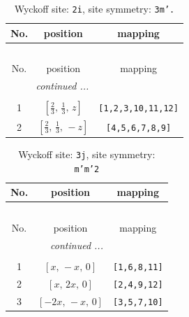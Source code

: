 \documentclass[fleqn,8pt]{jsarticle}
\begin{document}
\renewcommand{\arraystretch}{1.2}
\begin{longtable}{ccc}
\caption{Wyckoff site: {\tt 2i}, site symmetry: {\tt 3m'.}}
 \\
 \hline \hline
No. & position & mapping \\ \hline \endfirsthead

\multicolumn{2}{l}{\tablename\ \thetable{}} \\
 \hline \hline
No. & position & mapping \\ \hline \endhead

 \hline \hline
\multicolumn{2}{r}{\footnotesize\it continued ...} \\ \endfoot

 \hline \hline
\multicolumn{2}{r}{} \\ \endlastfoot

1 & $\left[ \frac{2}{3},\, \frac{1}{3},\, z \right]$ & {\tt [1,2,3,10,11,12]} \\ \hline
2 & $\left[ \frac{2}{3},\, \frac{1}{3},\, - z \right]$ & {\tt [4,5,6,7,8,9]} \\
\end{longtable}
\renewcommand{\arraystretch}{1.2}
\begin{longtable}{ccc}
\caption{Wyckoff site: {\tt 3j}, site symmetry: {\tt m'm'2}}
 \\
 \hline \hline
No. & position & mapping \\ \hline \endfirsthead

\multicolumn{2}{l}{\tablename\ \thetable{}} \\
 \hline \hline
No. & position & mapping \\ \hline \endhead

 \hline \hline
\multicolumn{2}{r}{\footnotesize\it continued ...} \\ \endfoot

 \hline \hline
\multicolumn{2}{r}{} \\ \endlastfoot

1 & $\left[ x,\, - x,\, 0 \right]$ & {\tt [1,6,8,11]} \\ \hline
2 & $\left[ x,\, 2 x,\, 0 \right]$ & {\tt [2,4,9,12]} \\ \hline
3 & $\left[ - 2 x,\, - x,\, 0 \right]$ & {\tt [3,5,7,10]} \\
\end{longtable}
\renewcommand{\arraystretch}{1.2}
\end{document}
